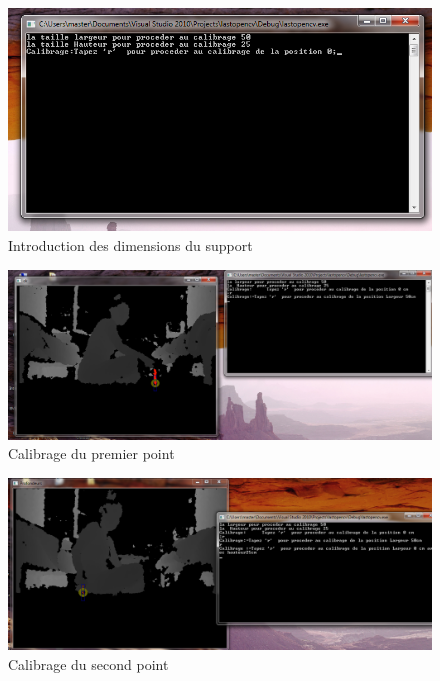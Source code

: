 \documentclass[12pt,a4paper,oneside]{book}
\begin{document}
	\begin{figure}[H]	\centering
		\includegraphics[scale=0.7]{images/it2.png}
		\caption{Introduction des dimensions du support}
		\label{fig9}
	\end{figure}
	
	\begin{figure}[H]
		\centering
		\includegraphics[scale=0.47]{images/it3.png}
		\caption{Calibrage du premier point}
		\label{fig10}
	\end{figure}
	
	\begin{figure}[H]
		\centering
		\includegraphics[scale=0.47]{images/it4.png}
		\caption{Calibrage du second point}
		\label{fig11}
	\end{figure}
	
\end{document}
